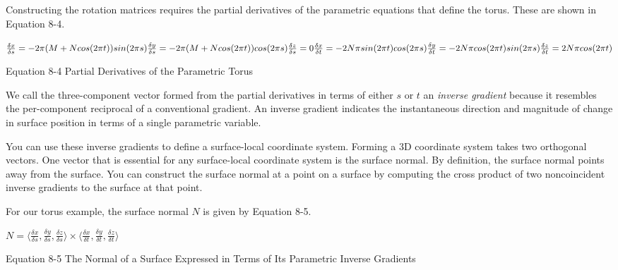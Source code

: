 \documentclass[../main.tex]{subfiles}
\begin{document}
Constructing the rotation matrices requires the partial derivatives of the parametric equations that define the torus. These are shown in Equation 8-4.

\FloatBarrier
\begin{equationcaption}
$
\frac{\delta x}{\delta s}=-2\pi (M+Ncos(2\pi t))sin(2\pi s) \newline
\frac{\delta y}{\delta s}=-2\pi (M+Ncos(2\pi t))cos(2\pi s) \newline
\frac{\delta z}{\delta s}=0 \newline
\newline
\frac{\delta x}{\delta t}=-2N\pi sin(2\pi t)cos(2\pi s) \newline
\frac{\delta y}{\delta t}=-2N\pi cos(2\pi t)sin(2\pi s) \newline
\frac{\delta z}{\delta t}=2N\pi cos(2\pi t) \newline
$
\caption{Equation 8-4 Partial Derivatives of the Parametric Torus}
\end{equationcaption}
\FloatBarrier

We call the three-component vector formed from the partial derivatives in terms of either $s$ or $t$ an \textit{inverse gradient} because it resembles the per-component reciprocal of a conventional gradient. An inverse gradient indicates the instantaneous direction and magnitude of change in surface position in terms of a single parametric variable.

You can use these inverse gradients to define a surface-local coordinate system. Forming a 3D coordinate system takes two orthogonal vectors. One vector that is essential for any surface-local coordinate system is the surface normal. By definition, the surface normal points away from the surface. You can construct the surface normal at a point on a surface by computing the cross product of two noncoincident inverse gradients to the surface at that point.

For our torus example, the surface normal $N$ is given by Equation 8-5.

\FloatBarrier
\begin{equationcaption}
$
N=\langle \frac{\delta x}{\delta s},\frac{\delta y}{\delta s},\frac{\delta z}{\delta s}\rangle \times \langle \frac{\delta x}{\delta t},\frac{\delta y}{\delta t},\frac{\delta z}{\delta t}\rangle
$
\caption{Equation 8-5 The Normal of a Surface Expressed in Terms of Its Parametric Inverse Gradients}
\end{equationcaption}
\FloatBarrier
\end{document}
